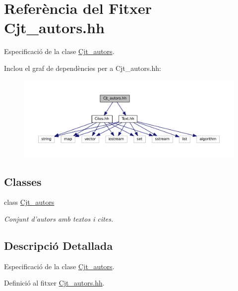 \hypertarget{_cjt__autors_8hh}{\section{Referència del Fitxer Cjt\+\_\+autors.\+hh}
\label{_cjt__autors_8hh}
}


Especificació de la clase \hyperlink{class_cjt__autors}{Cjt\+\_\+autors}.  


Inclou el graf de dependències per a Cjt\+\_\+autors.\+hh\+:
\nopagebreak
\begin{figure}[H]
\begin{center}
\leavevmode
\includegraphics[width=350pt]{_cjt__autors_8hh__incl}
\end{center}
\end{figure}
\subsection*{Classes}
\begin{DoxyCompactItemize}
\item 
class \hyperlink{class_cjt__autors}{Cjt\+\_\+autors}
\begin{DoxyCompactList}\small\item\em Conjunt d'autors amb textos i cites. \end{DoxyCompactList}\end{DoxyCompactItemize}


\subsection{Descripció Detallada}
Especificació de la clase \hyperlink{class_cjt__autors}{Cjt\+\_\+autors}. 



Definició al fitxer \hyperlink{_cjt__autors_8hh_source}{Cjt\+\_\+autors.\+hh}.


